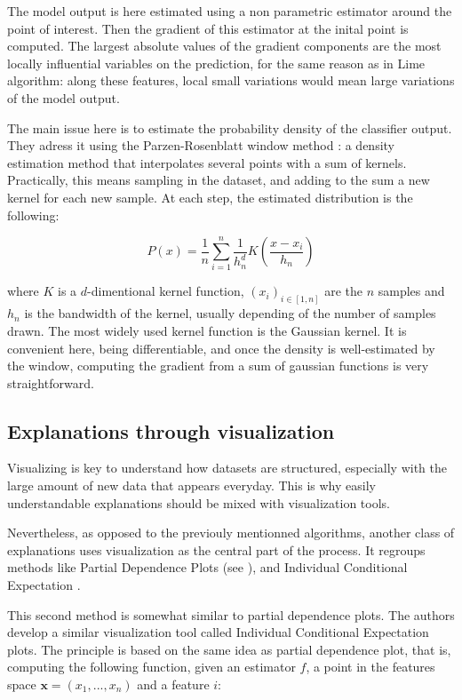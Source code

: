\documentclass[a4paper,11pt]{kth-mag}
\begin{document}
The model output is here estimated using a non parametric estimator around the point of interest. Then the gradient of this estimator at the inital point is computed. The largest absolute values of the gradient components are the most locally influential variables on the prediction, for the same reason as in Lime algorithm: along these features, local small variations would mean large variations of the model output.

The main issue here is to estimate the probability density of the classifier output. They adress it using the Parzen-Rosenblatt window method \cite{parzen} \cite{rosenblatt}: a density estimation method that interpolates several points with a sum of kernels. Practically, this means sampling in the dataset, and adding to the sum a new kernel for each new sample. At each step, the estimated distribution is the following:

\[
	P(x) = \frac{1}{n} \sum_{i=1}^n \frac1{h_n^d} K \left( \frac{x - x_i}{h_n} \right)
\]

where $K$ is a $d$-dimentional kernel function, $(x_i)_{i \in [1,n]}$ are the $n$ samples and $h_n$ is the bandwidth of the kernel, usually depending of the number of samples drawn. The most widely used kernel function is the Gaussian kernel. It is convenient here, being differentiable, and once the density is well-estimated by the window, computing the gradient from a sum of gaussian functions is very straightforward.

\subsection{Explanations through visualization}

Visualizing is key to understand how datasets are structured, especially with the large amount of new data that appears everyday. This is why easily understandable explanations should be mixed with visualization tools.

Nevertheless, as opposed to the previouly mentionned algorithms, another class of explanations uses visualization as the central part of the process. It regroups methods like Partial Dependence Plots (see \cite{elementsofstats}), and Individual Conditional Expectation \cite{ice}.

This second method is somewhat similar to partial dependence plots. The authors develop a similar visualization tool called Individual Conditional Expectation plots. The principle is based on the same idea as partial dependence plot, that is, computing the following function, given an estimator $f$, a point in the features space $\mathbf{x} = (x_1, ..., x_n)$ and a feature $i$:
\end{document}
